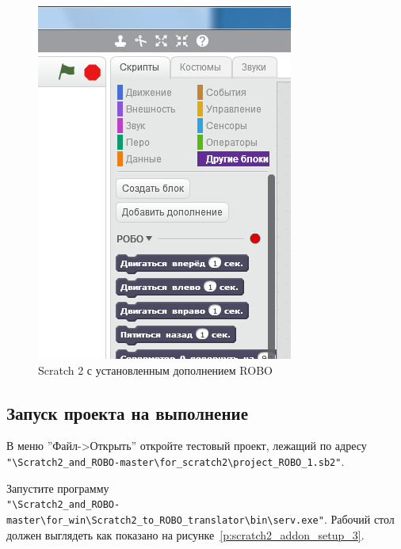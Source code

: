 \begin{figure}[H]\center
  \captionsetup{singlelinecheck=true} %
  \includegraphics*[scale=0.7]{about/images/scratch2_addon_setup_2}
  \caption{Scratch 2 с установленным дополнением ROBO} \label{p:scratch2_addon_setup_2}
\end{figure}



\subsection{Запуск проекта на выполнение}

В меню  ''Файл->Открыть'' откройте тестовый проект, лежащий по адресу \\  \verb|"\Scratch2_and_ROBO-master\for_scratch2\project_ROBO_1.sb2"|.

Запустите программу \\ \verb|"\Scratch2_and_ROBO-master\for_win\Scratch2_to_ROBO_translator\bin\serv.exe"|. Рабочий стол должен выглядеть как показано на рисунке~\ref{p:scratch2_addon_setup_3}.

